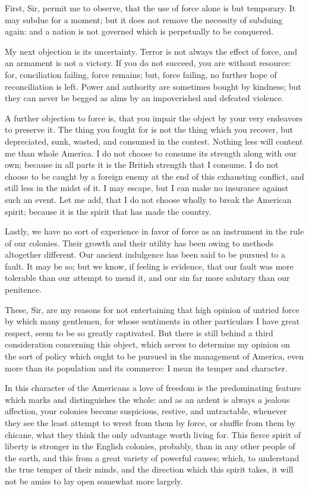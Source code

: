 First, Sir, permit me to observe, that the use of force alone is but temporary. It may subdue for a moment; but it does not remove the necessity of subduing again: and a nation is not governed which is perpetually to be conquered.

My next objection is its uncertainty. Terror is not always the effect of force, and an armament is not a victory. If you do not succeed, you are without resource: for, conciliation failing, force remains; but, force failing, no further hope of reconciliation is left. Power and authority are sometimes bought by kindness; but they can never be begged as alms by an impoverished and defeated violence.

A further objection to force is, that you impair the object by your very endeavors to preserve it. The thing you fought for is not the thing which you recover, but depreciated, sunk, wasted, and consumed in the contest. Nothing less will content me than whole America. I do not choose to consume its strength along with our own; because in all parts it is the British strength that I consume. I do not choose to be caught by a foreign enemy at the end of this exhausting conflict, and still less in the midst of it. I may escape, but I can make no insurance against such an event. Let me add, that I do not choose wholly to break the American spirit; because it is the spirit that has made the country.

Lastly, we have no sort of experience in favor of force as an instrument in the rule of our colonies. Their growth and their utility has been owing to methods altogether different. Our ancient indulgence has been said to be pursued to a fault. It may be so; but we know, if feeling is evidence, that our fault was more tolerable than our attempt to mend it, and our sin far more salutary than our penitence.

These, Sir, are my reasons for not entertaining that high opinion of untried force by which many gentlemen, for whose sentiments in other particulars I have great respect, seem to be so greatly captivated. But there is still behind a third consideration concerning this object, which serves to determine my opinion on the sort of policy which ought to be pursued in the management of America, even more than its population and its commerce: I mean its temper and character.

In this character of the Americans a love of freedom is the predominating feature which marks and distinguishes the whole: and as an ardent is always a jealous affection, your colonies become suspicious, restive, and untractable, whenever they see the least attempt to wrest from them by force, or shuffle from them by chicane, what they think the only advantage worth living for. This fierce spirit of liberty is stronger in the English colonies, probably, than in any other people of the earth, and this from a great variety of powerful causes; which, to understand the true temper of their minds, and the direction which this spirit takes, it will not be amiss to lay open somewhat more largely.


